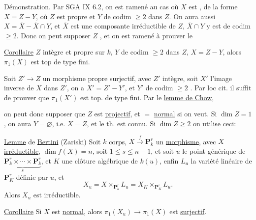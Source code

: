 
Démonstration. Par SGA IX 6.2, on est ramené au cas où
$X$ est ,
 de la forme $X=Z-Y$, où $Z$ est propre et $Y$ de
codim $\geq2$ dans $Z$.
On aura aussi $X=\overline X-\overline X\cap Y$,
et $\overline X$ est une composante irréductible de $Z$,
$\overline X\cap Y$ y est de codim $\geq2$.
Donc on peut supposer $Z$
,
et on est ramené à prouver le

\uline{Corollaire} $Z$ intègre et propre sur $k$, $Y$ de
codim $\geq2$ dans $Z$, $X=Z-Y$,
alors $\pi_1(X)$ est top de type fini.

Soit $Z'\to Z$ un morphisme propre surjectif, avec $Z'$ intègre,
soit $X'$ l'image inverse de $X$ dans $Z'$,
on a $X'=Z'-Y'$, et $Y'$ de codim $\geq2$
.
Par loc cit. il suffit de prouver que $\pi_1(X')$ est top.
de type fini. Par le \uline{lemme de Chow},

on peut donc supposer que $Z$ est \uline{projectif},
 et $=$ \uline{normal} si on veut.
Si 
$\dim Z=1$, on aura $Y=\varnothing$, i.e. $X=Z$,
et le th. est connu. Si $\dim Z\geq2$ on utilise ceci:

\uline{Lemme} de \uline{Bertini} (Zariski)
Soit $k$ corps,
$X\xrightarrow{f}\mathbf P_k^r$ un \uline{morphisme},
avec $X$ \uline{irréductible},
$\dim f(X)=n$, soit $1\leq s\leq n-1$, et soit $u$
le point générique de
$\underbrace{\mathbf P_k^r\times\cdots\times\mathbf P_k^r}_{s}$,
et $K$ une clôture algébrique de $k(u)$,
enfin $L_u$ la variété linéaire de $\mathbf P_K^r$ définie par $u$,
et
\[
X_u=X\times_{\mathbf P_k^r}L_u=X_K\times_{\mathbf P_K^r}L_u.
\]
Alors $X_u$ est irréductible.



\uline{Corollaire} 
Si $X$ est \uline{normal}, alors
$\pi_1(X_u)\to\pi_1(X)$ est \uline{surjectif}.

